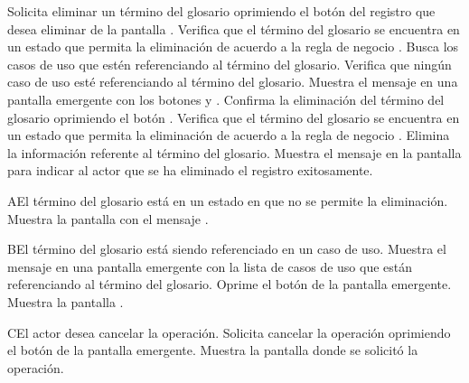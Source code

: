  \begin{UCtrayectoria}
    \UCpaso[\UCactor] Solicita eliminar un término del glosario oprimiendo el botón \btnEliminar del registro que desea eliminar de la pantalla .
    \UCpaso[\UCsist] Verifica que el término del glosario se encuentra en un estado que permita la eliminación de acuerdo a la regla de negocio . 
    \UCpaso[\UCsist] Busca los casos de uso que estén referenciando al término del glosario.
    \UCpaso[\UCsist] Verifica que ningún caso de uso esté referenciando al término del glosario. 
    \UCpaso[\UCsist] Muestra el mensaje  en una pantalla emergente con los botones  y .
    \UCpaso[\UCactor] Confirma la eliminación del término del glosario oprimiendo el botón . 
    \UCpaso[\UCsist] Verifica que el término del glosario se encuentra en un estado que permita la eliminación de acuerdo a la regla de negocio . 
    \UCpaso[\UCsist] Elimina la información referente al término del glosario.
    \UCpaso[\UCsist] Muestra el mensaje  en la pantalla 
    para indicar al actor que se ha eliminado el registro exitosamente.
 \end{UCtrayectoria}
 
 \begin{UCtrayectoriaA}{A}{El término del glosario está en un estado en que no se permite la eliminación.}
    \UCpaso[\UCsist] Muestra la pantalla  con el mensaje .
 \end{UCtrayectoriaA} 
 \begin{UCtrayectoriaA}{B}{El término del glosario está siendo referenciado en un caso de uso.}
    \UCpaso[\UCsist] Muestra el mensaje  en una pantalla emergente
    con la lista de casos de uso que están referenciando al término del glosario.
    \UCpaso[\UCactor] Oprime el botón  de la pantalla emergente.
    \UCpaso[\UCsist] Muestra la pantalla .
 \end{UCtrayectoriaA}
 \begin{UCtrayectoriaA}{C}{El actor desea cancelar la operación.}
    \UCpaso[\UCactor] Solicita cancelar la operación oprimiendo el botón  de la pantalla emergente.
    \UCpaso[\UCsist] Muestra la pantalla donde se solicitó la operación.
 \end{UCtrayectoriaA} 